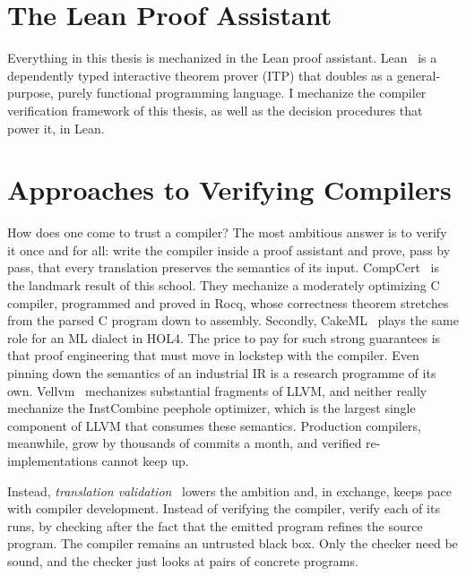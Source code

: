 \section{The Lean Proof Assistant}

Everything in this thesis is mechanized in the Lean proof assistant.
Lean~\citep{demoura2021lean} is a dependently typed interactive theorem
prover (ITP) that doubles as a general-purpose, purely functional programming
language. I mechanize the compiler verification framework of this thesis,
as well as the decision procedures that power it, in Lean.


\section{Approaches to Verifying Compilers}
\label{sec:bg:compiler-verification}

How does one come to trust a compiler? The most ambitious answer is to verify
it once and for all: write the compiler inside a proof assistant and prove,
pass by pass, that every translation preserves the semantics of its input.
CompCert~\citep{leroy2009formally,leroy2016compcert} is the landmark result of
this school. They mechanize a moderately optimizing C compiler, programmed and proved in
Rocq, whose correctness theorem stretches from the parsed C program down to
assembly. Secondly, CakeML~\citep{kumar2014cakeml} plays the same role for an ML
dialect in HOL4. The price to pay for such strong guarantees is that
proof engineering that must move in lockstep with the compiler. Even pinning
down the semantics of an industrial IR is a research programme of its own.
Vellvm~\citep{zhao2012formalizing,zhao2013formal} mechanizes substantial fragments of LLVM,
and neither really mechanize the InstCombine peephole optimizer, 
which is the largest single component of LLVM that consumes these semantics.
Production compilers, meanwhile, grow by thousands of commits a month,
and verified re-implementations cannot keep up.

Instead, \emph{translation validation}~\citep{pnueli1998translation} lowers the
ambition and, in exchange, keeps pace with compiler development.
Instead of verifying the compiler, verify each of its runs,
by checking after the fact that the emitted program refines the source program.
The compiler remains an untrusted black box.
Only the checker need be sound, and the checker just looks at pairs of concrete programs.

